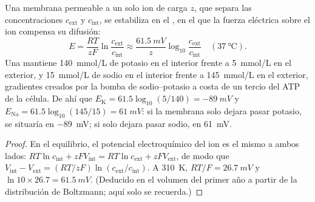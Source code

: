 \begin{theorem}\label{thm:b2:neurons-synapses:nernst}
Una membrana permeable a un solo ion de carga $z$, que separa las
concentraciones $c_{\text{ext}}$ y $c_{\text{int}}$, se estabiliza en el
\emph{}, en el que la fuerza eléctrica sobre el ion
compensa su difusión:
\[
E = \frac{RT}{zF}\ln\frac{c_{\text{ext}}}{c_{\text{int}}} \approx \frac{\qty{61.5}{mV}}{z}\log_{10}\frac{c_{\text{ext}}}{c_{\text{int}}} \quad (\qty{37}{\celsius}).
\]
Una  mantiene \qty{140}{mmol/L} de potasio en el interior frente
a \qty{5}{mmol/L} en el exterior, y \qty{15}{mmol/L} de sodio en el
interior frente a \qty{145}{mmol/L} en el exterior, gradientes creados
por la bomba de sodio--potasio a costa de un tercio del ATP de la célula.
De ahí que $E_{\mathrm K} = 61.5\log_{10}(5/140) = \qty{-89}{mV}$ y
$E_{\mathrm{Na}} = 61.5\log_{10}(145/15) = \qty{+61}{mV}$: si la
membrana solo dejara pasar potasio, se situaría en
\qty{-89}{mV}; si solo dejara pasar sodio, en \qty{+61}{mV}.
\end{theorem}
\begin{proof}
En el equilibrio, el potencial electroquímico del ion es el mismo a ambos
lados: $RT\ln c_{\text{int}} + zFV_{\text{int}} = RT\ln
c_{\text{ext}} + zFV_{\text{ext}}$, de modo que $V_{\text{int}} -
V_{\text{ext}} = (RT/zF)\ln(c_{\text{ext}}/c_{\text{int}})$. A
\qty{310}{K}, $RT/F = \qty{26.7}{mV}$ y $\ln 10 \times 26.7 =
\qty{61.5}{mV}$. (Deducido en el volumen del primer año a partir de la
distribución de Boltzmann; aquí solo se recuerda.)
\end{proof}

